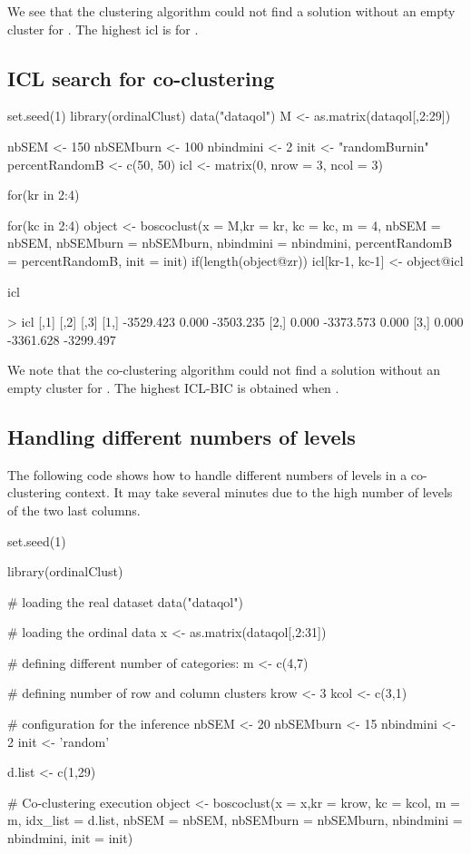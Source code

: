 We see that the clustering algorithm could not find a solution without an empty cluster for . The highest icl is for .

\subsection{ICL search for co-clustering}
\label{sec:appendix-icl-coclust}
\begin{example}
set.seed(1)
library(ordinalClust)
data("dataqol")
M <- as.matrix(dataqol[,2:29])

nbSEM <- 150
nbSEMburn <- 100
nbindmini <- 2
init <-  "randomBurnin"
percentRandomB <- c(50, 50)
icl <- matrix(0, nrow = 3, ncol = 3)

for(kr in 2:4){
    for(kc in 2:4){
        object <- boscoclust(x = M,kr = kr, kc = kc, m = 4, nbSEM = nbSEM,  
                        nbSEMburn = nbSEMburn, nbindmini = nbindmini,
                        percentRandomB = percentRandomB, init = init)
        if(length(object@zr)){
       icl[kr-1, kc-1] <- object@icl 
      } 
    }

}

icl
\end{example}
\begin{example}
> icl
          [,1]      [,2]      [,3] 
[1,] -3529.423     0.000 -3503.235    
[2,]     0.000 -3373.573     0.000    
[3,]     0.000 -3361.628 -3299.497    

\end{example}

We note that the co-clustering algorithm could not find a solution without an empty cluster for . The highest ICL-BIC is obtained when .

\subsection{Handling different numbers of levels}
\label{sec:appendix-diff-m}
The following code shows how to handle different numbers of levels in a co-clustering context. It may take several minutes due to the high number of levels of the two last columns.

\begin{example}
set.seed(1)

library(ordinalClust)

# loading the real dataset
data("dataqol")

# loading the ordinal data
x <- as.matrix(dataqol[,2:31])


# defining different number of categories:
m <- c(4,7)


# defining number of row and column clusters
krow <- 3
kcol <- c(3,1)

# configuration for the inference
nbSEM <- 20
nbSEMburn <- 15
nbindmini <- 2
init <- 'random'

d.list <- c(1,29)

# Co-clustering execution
object <- boscoclust(x = x,kr = krow, kc = kcol, m = m,
                idx_list = d.list, nbSEM = nbSEM,
                nbSEMburn = nbSEMburn, nbindmini = nbindmini,
                init = init)
\end{example}

